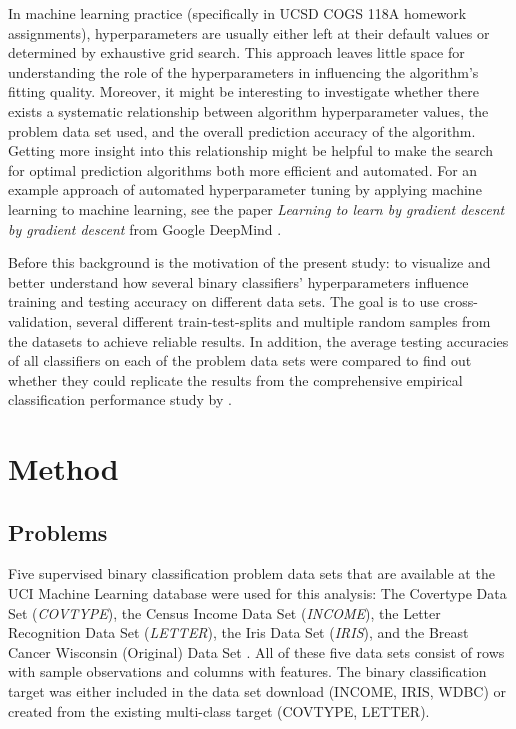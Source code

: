 \documentclass[twoside,11pt]{article}
\begin{document}
		In machine learning practice (specifically in UCSD COGS 118A homework assignments), hyperparameters are usually either left at their default values or determined by exhaustive grid search. This approach leaves little space for understanding the role of the hyperparameters in influencing the algorithm's fitting quality. Moreover, it might be interesting to investigate whether there exists a systematic relationship between algorithm hyperparameter values, the problem data set used, and the overall prediction accuracy of the algorithm. Getting more insight into this relationship might be helpful to make the search for optimal prediction algorithms both more efficient and automated. For an example approach of automated hyperparameter tuning by applying machine learning to machine learning, see the paper \textit{Learning to learn by gradient descent by gradient descent} from Google DeepMind \citep{andrychowicz_learning_2016}.
		
		Before this background is the motivation of the present study: to visualize and better understand how several binary classifiers' hyperparameters influence training and testing accuracy on different data sets. The goal is to use cross-validation, several different train-test-splits and multiple random samples from the datasets to achieve reliable results. In addition, the average testing accuracies of all classifiers on each of the problem data sets were compared to find out whether they could replicate the results from the comprehensive empirical classification performance study by \cite{caruana_empirical_2006}.
	
	\section{Method}
		\subsection{Problems}
			Five supervised binary classification problem data sets that are available at the UCI Machine Learning database \citep{dheeru_uci_2017} were used for this analysis: The Covertype Data Set (\textit{COVTYPE}), the Census Income Data Set (\textit{INCOME}), the Letter Recognition Data Set (\textit{LETTER}), the Iris Data Set (\textit{IRIS}), and the Breast Cancer Wisconsin (Original) Data Set \citep[\textit{WDBC}][]{mangasarian_cancer_1990}. All of these five data sets consist of rows with sample observations and columns with features. The binary classification target was either included in the data set download (INCOME, IRIS, WDBC) or created from the existing multi-class target (COVTYPE, LETTER).
			
\end{document}
